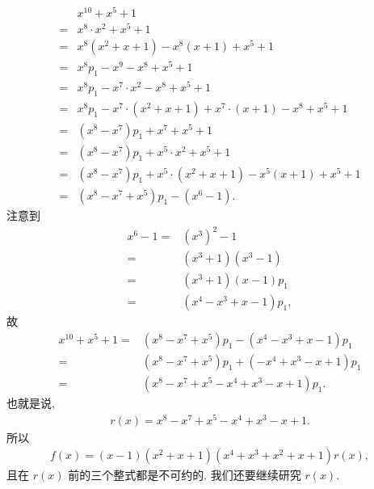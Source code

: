 \begin{example}
    \begin{align*}
             & x^{10} + x^5 + 1                                                      \\
        = {} & x^8 \cdot x^2 + x^5 + 1                                               \\
        = {} & x^8 (x^2 + x + 1) - x^8 (x + 1) + x^5 + 1                             \\
        = {} & x^8 p_1 - x^9 - x^8 + x^5 + 1                                         \\
        = {} & x^8 p_1 - x^7 \cdot x^2 - x^8 + x^5 + 1                               \\
        = {} & x^8 p_1 - x^7 \cdot (x^2 + x + 1) + x^7 \cdot (x + 1) - x^8 + x^5 + 1 \\
        = {} & (x^8 - x^7) p_1 + x^7 + x^5 + 1                                       \\
        = {} & (x^8 - x^7) p_1 + x^5 \cdot x^2 + x^5 + 1                             \\
        = {} & (x^8 - x^7) p_1 + x^5 \cdot (x^2 + x + 1) - x^5 (x + 1) + x^5 + 1     \\
        = {} & (x^8 - x^7 + x^5) p_1 - (x^6 - 1).
    \end{align*}
    注意到
    \begin{align*}
        x^6 - 1
        = {} & (x^3)^2 - 1              \\
        = {} & (x^3 + 1) (x^3 - 1)      \\
        = {} & (x^3 + 1) (x - 1) p_1    \\
        = {} & (x^4 - x^3 + x - 1) p_1,
    \end{align*}
    故
    \begin{align*}
        x^{10} + x^5 + 1
        = {} & (x^8 - x^7 + x^5) p_1 - (x^4 - x^3 + x - 1) p_1  \\
        = {} & (x^8 - x^7 + x^5) p_1 + (-x^4 + x^3 - x + 1) p_1 \\
        = {} & (x^8 - x^7 + x^5 - x^4 + x^3 - x + 1) p_1.
    \end{align*}
    也就是说,
    \begin{align*}
        r(x) = x^8 - x^7 + x^5 - x^4 + x^3 - x + 1.
    \end{align*}
    所以
    \begin{align*}
        f(x) = (x-1) (x^2+x+1) (x^4+x^3+x^2+x+1) r(x),
    \end{align*}
    且在 $r(x)$ 前的三个整式都是不可约的. 我们还要继续研究 $r(x)$.


\end{example}
